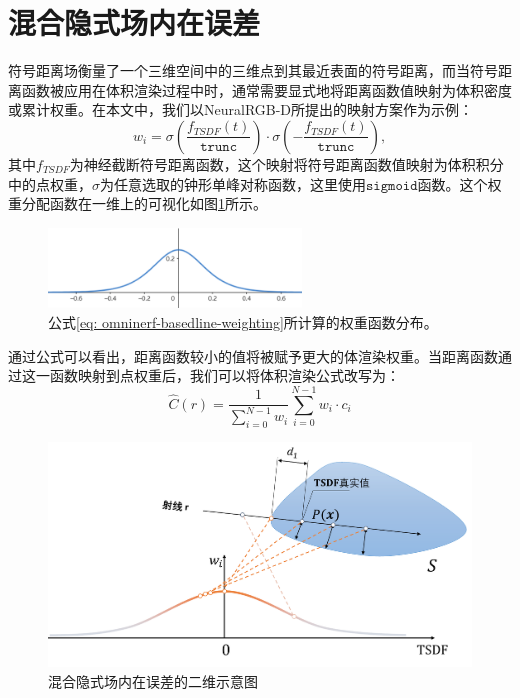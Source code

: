 \section{混合隐式场内在误差}
符号距离场衡量了一个三维空间中的三维点到其最近表面的符号距离，而当符号距离函数被应用在体积渲染过程中时，通常需要显式地将距离函数值映射为体积密度或累计权重。在本文中，我们以NeuralRGB-D\cite{azinovic_neural_2022}所提出的映射方案作为示例：
\begin{equation}
    w_i = \sigma\left(\frac{f_{TSDF}(t)}{\mathtt{trunc}}\right)\cdot\sigma\left(-\frac{f_{TSDF}(t)}{\mathtt{trunc}}\right),
    \label{eq: omninerf-basedline-weighting}
\end{equation}
其中$f_{TSDF}$为神经截断符号距离函数，这个映射将符号距离函数值映射为体积积分中的点权重，$\sigma$为任意选取的钟形单峰对称函数，这里使用$\mathtt{sigmoid}$函数。这个权重分配函数在一维上的可视化如图\ref{fig:omninerf-baseline-weighting}所示。

\begin{figure}[ht]
    \centering
    \includegraphics[width=0.6\textwidth]{undergraduate-thesis/images/omni-nerf/neural-rgbd weighting function.png}
    \caption{公式\ref{eq: omninerf-basedline-weighting}所计算的权重函数分布。}
    \label{fig:omninerf-baseline-weighting}
\end{figure}

通过公式可以看出，距离函数较小的值将被赋予更大的体渲染权重。当距离函数通过这一函数映射到点权重后，我们可以将体积渲染公式改写为：
\begin{equation}
    \hat{C}(r) = \frac 1 {\sum_{i=0}^{N-1}w_i}\sum_{i=0}^{N-1}w_i\cdot c_i
\end{equation}

\begin{figure}[t]
    \centering
    \includegraphics[width=\textwidth]{undergraduate-thesis/images/omni-nerf/omninerf-error2.pdf}
    \caption{混合隐式场内在误差的二维示意图}
    \label{fig:omninerf-internal error}
\end{figure}

